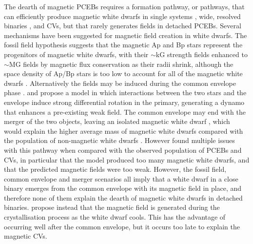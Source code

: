 \documentclass[fleqn,usenatbib]{mnras}
\begin{document}
The dearth of magnetic PCEBs requires a formation pathway, or pathways, that can efficiently produce magnetic white dwarfs in single systems \citep[with an occurrence rate of $\sim10$--20\,per\,cent,][]{kawkaetal07-1, hollandsetal15-1, holbergetal16-1}, wide, resolved binaries \citep[occurrence rate unconstrained but multiple systems known, e.g.][]{dobbieetal12-1}, and CVs, but that rarely generates fields in detached PCEBs. Several mechanisms have been suggested for magnetic field creation in white dwarfs. The fossil field hypothesis \citep{woltjer64-1, angeletal81-1, braithwaite+spruit04-1} suggests that the magnetic Ap and Bp stars represent the progenitors of magnetic white dwarfs, with their $\sim$kG strength fields enhanced to $\sim$MG fields by magnetic flux conservation as their radii shrink, although the space density of Ap/Bp stars is too low to account for all of the magnetic white dwarfs \citep{kawka+vennes04-1}. Alternatively the fields may be induced during the common envelope phase \citep{toutetal04-1, nordhausetal11-1}. \citet{wickramasingheetal14-1} and \citet{briggsetal18-1} propose a model in which interactions between the two stars and the envelope induce strong differential rotation in the primary, generating a dynamo that enhances a pre-existing weak field. The common envelope may end with the merger of the two objects, leaving an isolated magnetic white dwarf \citep{briggsetal15-1}, which would explain the higher average mass of magnetic white dwarfs compared with the population of non-magnetic white dwarfs \citep{ferrarioetal15-1}. However \citet{bellonietal20-1} found multiple issues with this pathway when compared with the observed population of PCEBs and CVs, in particular that the model produced too many magnetic white dwarfs, and that the predicted magnetic fields were too weak. However, the fossil field, common envelope and merger scenarios all imply that a white dwarf in a close binary emerges from the common envelope with its magnetic field in place, and therefore none of them explain the dearth of magnetic white dwarfs in detached binaries. \citet{iserneral17-1} propose instead that the magnetic field is generated during the crystallisation process as the white dwarf cools. This has the advantage of occurring well after the common envelope, but it occurs too late to explain the magnetic CVs.   
\end{document}
